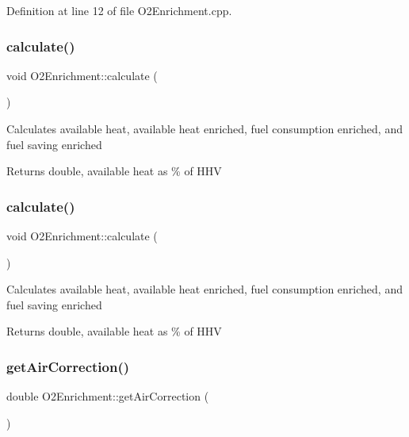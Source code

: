 Definition at line 12 of file O2\+Enrichment.\+cpp.

\mbox{\label{class_o2_enrichment_a91d7e18a336466cf9fbc0cae42dde282}} 
\subsubsection{\texorpdfstring{calculate()}{calculate()}\hspace{0.1cm}{\footnotesize\ttfamily [2/3]}}
{\footnotesize\ttfamily void O2\+Enrichment\+::calculate (\begin{DoxyParamCaption}{ }\end{DoxyParamCaption})}

Calculates available heat, available heat enriched, fuel consumption enriched, and fuel saving enriched \begin{DoxyReturn}{Returns}
double, available heat as \% of H\+HV 
\end{DoxyReturn}
\mbox{\label{class_o2_enrichment_a91d7e18a336466cf9fbc0cae42dde282}} 
\subsubsection{\texorpdfstring{calculate()}{calculate()}\hspace{0.1cm}{\footnotesize\ttfamily [3/3]}}
{\footnotesize\ttfamily void O2\+Enrichment\+::calculate (\begin{DoxyParamCaption}{ }\end{DoxyParamCaption})}

Calculates available heat, available heat enriched, fuel consumption enriched, and fuel saving enriched \begin{DoxyReturn}{Returns}
double, available heat as \% of H\+HV 
\end{DoxyReturn}
\mbox{\label{class_o2_enrichment_a95f854d807f2b33ca32c68707e627283}} 
\subsubsection{\texorpdfstring{get\+Air\+Correction()}{getAirCorrection()}\hspace{0.1cm}{\footnotesize\ttfamily [1/3]}}
{\footnotesize\ttfamily double O2\+Enrichment\+::get\+Air\+Correction (\begin{DoxyParamCaption}{ }\end{DoxyParamCaption})\hspace{0.3cm}{\ttfamily [inline]}}

